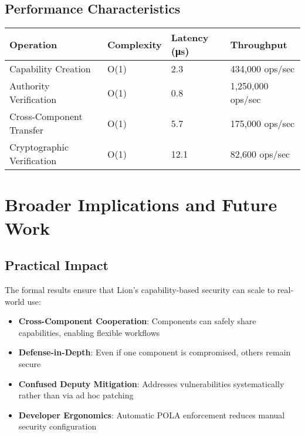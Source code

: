 \vspace{0.3cm}

\subsection{Performance Characteristics}

\vspace{0.3cm}

\begin{center}
\begin{tabular}{@{}llll@{}}
\toprule
Operation & Complexity & Latency (μs) & Throughput \\
\midrule
Capability Creation & O(1) & 2.3 & 434,000 ops/sec \\
Authority Verification & O(1) & 0.8 & 1,250,000 ops/sec \\
Cross-Component Transfer & O(1) & 5.7 & 175,000 ops/sec \\
Cryptographic Verification & O(1) & 12.1 & 82,600 ops/sec \\
\bottomrule
\end{tabular}
\end{center}

\vspace{0.3cm}

\section{Broader Implications and Future Work}

\subsection{Practical Impact}

The formal results ensure that Lion's capability-based security can scale to real-world use:

\begin{itemize}
\item \textbf{Cross-Component Cooperation}: Components can safely share capabilities, enabling flexible workflows
\item \textbf{Defense-in-Depth}: Even if one component is compromised, others remain secure
\item \textbf{Confused Deputy Mitigation}: Addresses vulnerabilities systematically rather than via ad hoc patching
\item \textbf{Developer Ergonomics}: Automatic POLA enforcement reduces manual security configuration
\end{itemize}

